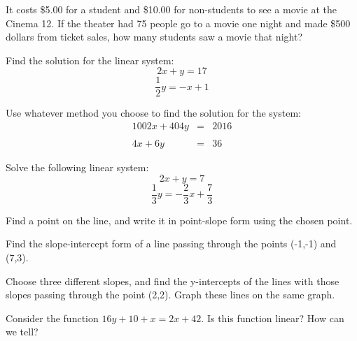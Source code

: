 \bigskip

\begin{exercise}
It costs \$5.00 for a student and \$10.00 for non-students to see a movie at the Cinema 12. If the theater had 75 people go to a movie one night and made \$500 dollars from ticket sales, how many students saw a movie that night?
\end{exercise}

\bigskip

\begin{exercise}
	Find the solution for the linear system:
	$$
	2x+y=17
	$$
	$$
	\frac{1}{2}y=-x +1
	$$	
\end{exercise}

\bigskip

\begin{exercise}
Use whatever method you choose to find the solution for the system:
$$
\begin{array}{rcl}	
1002x + 404y &=  & 2016 \\ \\
4x + 6y &= &36
\end{array}
$$ 
\end{exercise}
\bigskip

\begin{exercise}
Solve the following linear system:
$$
2x+ y = 7 
$$
$$
\frac{1}{3}y = -\frac{2}{3}x + \frac{7}{3}
$$	
\end{exercise}

\bigskip

\begin{exercise}
Find a point on the line, and write it in point-slope form using the chosen point.
\end{exercise}

\bigskip

\begin{exercise}
Find the slope-intercept form of a line passing through the points (-1,-1) and (7,3).
\end{exercise}

\bigskip

\begin{exercise}
Choose three different slopes, and find the y-intercepts of  the lines with those slopes passing through the point (2,2).  Graph these lines on the same graph.
\end{exercise}

\bigskip

\begin{exercise}
	Consider the function $16y + 10 + x = 2x + 42$. Is this function linear? How can we tell?
\end{exercise}
